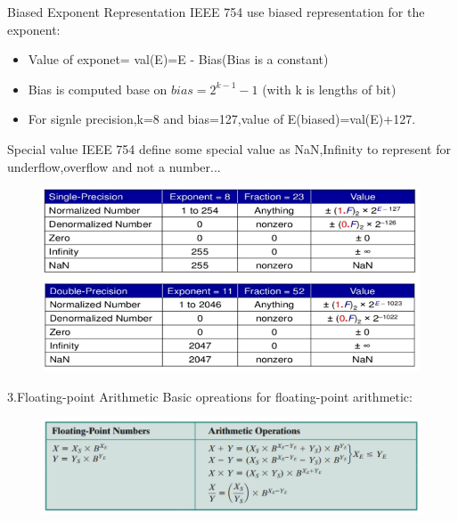 \documentclass[11pt]{beamer}
\begin{document}
\begin{frame}[t]{Biased Exponent Representation}
IEEE 754 use biased representation for the exponent:
\begin{itemize}
\item Value of exponet= val(E)=E - Bias(Bias is a constant)
\item Bias is computed base on $bias=2^{k-1}-1$ (with k is lengths of bit)
\item For signle precision,k=8 and bias=127,value of E(biased)=val(E)+127.
\end{itemize}
\end{frame}
\begin{frame}[t]{Special value}
IEEE 754 define some special value as NaN,Infinity to represent for underflow,overflow and not a number...\begin{center}
    \begin{figure}[htp]
    \begin{center}
     \includegraphics[scale=.5]{image/fig25}
    \end{center}
    \label{reffig25}
    \end{figure}
\end{center}

\end{frame}
\begin{frame}[t]{3.Floating-point Arithmetic}
Basic opreations for floating-point arithmetic:
\begin{center}
    \begin{figure}[htp]
    \begin{center}
     \includegraphics[scale=.4]{image/fig26}
    \end{center}
    \label{reffig26}
    \end{figure}
\end{center}
\end{frame}
\end{document}
